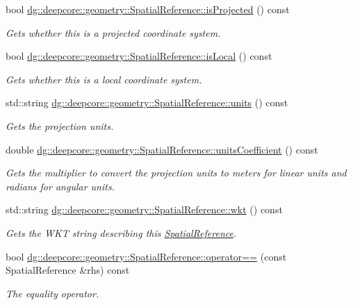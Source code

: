 \begin{DoxyCompactItemize}
bool \hyperlink{group___imagery_module_gaae4f5ba455b10e8f1964f9f20b4c486a}{dg\+::deepcore\+::geometry\+::\+Spatial\+Reference\+::is\+Projected} () const 
\begin{DoxyCompactList}\small\item\em Gets whether this is a projected coordinate system. \end{DoxyCompactList}\item 
bool \hyperlink{group___imagery_module_gad3e91dd4112c714c81850ab4c4dc0d2d}{dg\+::deepcore\+::geometry\+::\+Spatial\+Reference\+::is\+Local} () const 
\begin{DoxyCompactList}\small\item\em Gets whether this is a local coordinate system. \end{DoxyCompactList}\item 
std\+::string \hyperlink{group___imagery_module_gabd8135b44030a971a078c0d8fbe2be26}{dg\+::deepcore\+::geometry\+::\+Spatial\+Reference\+::units} () const 
\begin{DoxyCompactList}\small\item\em Gets the projection units. \end{DoxyCompactList}\item 
double \hyperlink{group___imagery_module_gad2a19eadaf57004567c09badf4fdaab3}{dg\+::deepcore\+::geometry\+::\+Spatial\+Reference\+::units\+Coefficient} () const 
\begin{DoxyCompactList}\small\item\em Gets the multiplier to convert the projection units to meters for linear units and radians for angular units. \end{DoxyCompactList}\item 
std\+::string \hyperlink{group___imagery_module_ga82c05ce0a6e02aa7cec17a68131b5263}{dg\+::deepcore\+::geometry\+::\+Spatial\+Reference\+::wkt} () const 
\begin{DoxyCompactList}\small\item\em Gets the W\+KT string describing this \hyperlink{classdg_1_1deepcore_1_1geometry_1_1_spatial_reference}{Spatial\+Reference}. \end{DoxyCompactList}\item 
bool \hyperlink{group___imagery_module_ga447d6d2e3c69d16c90b6efe701b2d306}{dg\+::deepcore\+::geometry\+::\+Spatial\+Reference\+::operator==} (const Spatial\+Reference \&rhs) const 
\begin{DoxyCompactList}\small\item\em The equality operator. \end{DoxyCompactList}\item 

\end{DoxyCompactItemize}
